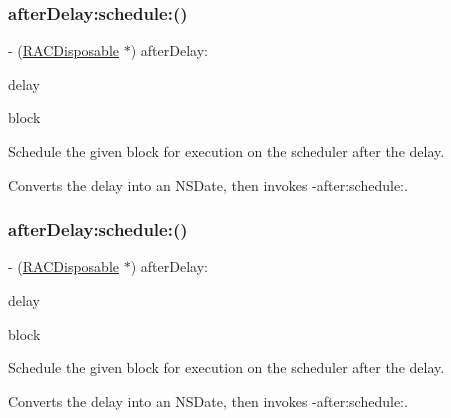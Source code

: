 \subsubsection{\texorpdfstring{after\+Delay\+:schedule\+:()}{afterDelay:schedule:()}\hspace{0.1cm}{\footnotesize\ttfamily [2/3]}}
{\footnotesize\ttfamily -\/ (\mbox{\hyperlink{interface_r_a_c_disposable}{R\+A\+C\+Disposable}} $\ast$) after\+Delay\+: \begin{DoxyParamCaption}\item[{(N\+S\+Time\+Interval)}]{delay }\item[{schedule:(void($^\wedge$)(void))}]{block }\end{DoxyParamCaption}}

Schedule the given block for execution on the scheduler after the delay.

Converts the delay into an N\+S\+Date, then invokes {\ttfamily -\/after\+:schedule\+:}. \mbox{\label{interface_r_a_c_scheduler_acc37181185138cba688a6e90da1a62fe}} 
\subsubsection{\texorpdfstring{after\+Delay\+:schedule\+:()}{afterDelay:schedule:()}\hspace{0.1cm}{\footnotesize\ttfamily [3/3]}}
{\footnotesize\ttfamily -\/ (\mbox{\hyperlink{interface_r_a_c_disposable}{R\+A\+C\+Disposable}} $\ast$) after\+Delay\+: \begin{DoxyParamCaption}\item[{(N\+S\+Time\+Interval)}]{delay }\item[{schedule:(void($^\wedge$)(void))}]{block }\end{DoxyParamCaption}}

Schedule the given block for execution on the scheduler after the delay.

Converts the delay into an N\+S\+Date, then invokes {\ttfamily -\/after\+:schedule\+:}. \mbox{\label{interface_r_a_c_scheduler_a67734f655b47abc041b32021cf72c017}} 
